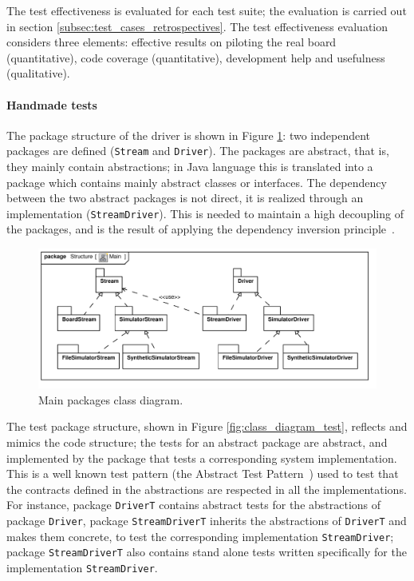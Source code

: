 \documentclass[english]{lni}
\newcommand{\lil}[1]{\texttt{\lstinline|#1|}}
\begin{document}
The test effectiveness is evaluated for each test suite; the evaluation is carried out in section \ref{subsec:test_cases_retrospectives}.
The test effectiveness evaluation considers three elements: effective results on piloting the real board (quantitative), code coverage
(quantitative), development help and usefulness (qualitative).

\paragraph*{Handmade tests}

The package structure of the driver is shown in Figure \ref{fig:class_diagram_main}: two independent packages are defined (\lil{Stream} and \lil{Driver}).  
The packages are abstract, that is, they mainly contain abstractions; in Java language this is translated into a package which contains mainly abstract classes or interfaces.  
The dependency between the two abstract packages is not direct, it is realized through an implementation (\lil{StreamDriver}).
This is needed to maintain a high decoupling of the packages, and is the result of applying the dependency inversion principle~\cite{Martin1996}.

\begin{figure}[htb!]
  \centering
  \includegraphics[scale=0.7]{UML_model/Class_Diagram__Structure__Main}
  \caption{Main packages class diagram.}
  \label{fig:class_diagram_main}
\end{figure}

The test package structure, shown in Figure \ref{fig:class_diagram_test}, reflects and mimics the code structure; the tests for an abstract package are abstract, and implemented by the package that tests a corresponding system implementation. 
This is a well known test pattern (the Abstract Test Pattern~\cite{Thomas2004}) used to test that the contracts defined in the abstractions are respected in all the implementations.  
For instance, package \lil{DriverT} contains abstract tests for the abstractions of package \lil{Driver}, package \lil{StreamDriverT} inherits the abstractions of \lil{DriverT} and makes them concrete, to test the corresponding implementation \lil{StreamDriver}; package \lil{StreamDriverT} also contains stand alone tests written specifically for the implementation \lil{StreamDriver}.
\end{document}
